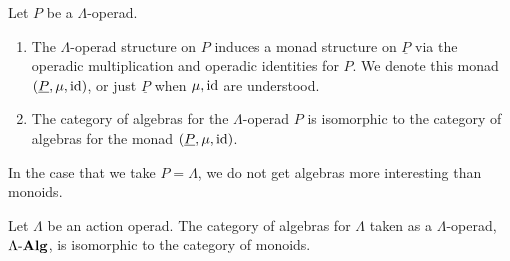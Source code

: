 \begin{prop}\label{prop:op=monad1}  Let $P$ be a $\Lambda$-operad.
  \begin{enumerate}
    \item The $\Lambda$-operad structure on $P$ induces a monad structure on $\underline{P}$ via the operadic multiplication and operadic identities for $P$. We denote this monad $(\underline{P}, \mu, \textrm{id})$, or just $\underline{P}$ when $\mu, \textrm{id}$ are understood.
    \item The category of algebras for the $\Lambda$-operad $P$ is isomorphic to the category of algebras for the monad $(\underline{P}, \mu, \textrm{id})$.
  \end{enumerate}
\end{prop}


In the case that we take $P = \Lambda$, we do not get algebras more interesting than monoids.
\begin{prop}\label{prop:Lalg=monoid}
Let $\Lambda$ be an action operad. The category of algebras for $\Lambda$ taken as a $\Lambda$-operad, $\Lambda\mbox{-}\mathbf{Alg}$, is isomorphic to the category of monoids.
\end{prop}
